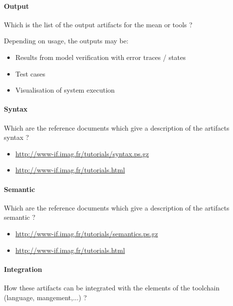     
\paragraph{Output}
    Which is the list of the output artifacts for the mean or tools ?

\begin{author_comment}
	Depending on usage, the outputs may be:
	\begin{itemize}
		\item Results from model verification with error traces / states
		\item Test cases
		\item Visualisation of system execution
	\end{itemize}
\end{author_comment}
    
\paragraph{Syntax}
    Which are the reference documents which give a description of the artifacts syntax  ?
    
\begin{author_comment}
	\begin{itemize}
		\item \url{http://www-if.imag.fr/tutorials/syntax.ps.gz}
		\item \url{http://www-if.imag.fr/tutorials.html}
	\end{itemize}
\end{author_comment}
    
    
\paragraph{Semantic}
    Which are the reference documents which give a description of the artifacts semantic  ?

\begin{author_comment}
	\begin{itemize}
		\item \url{http://www-if.imag.fr/tutorials/semantics.ps.gz}
		\item \url{http://www-if.imag.fr/tutorials.html}
	\end{itemize}
\end{author_comment}



\paragraph{Integration}
    How these artifacts can be integrated with the elements of the toolchain (language, mangement,...) ?

